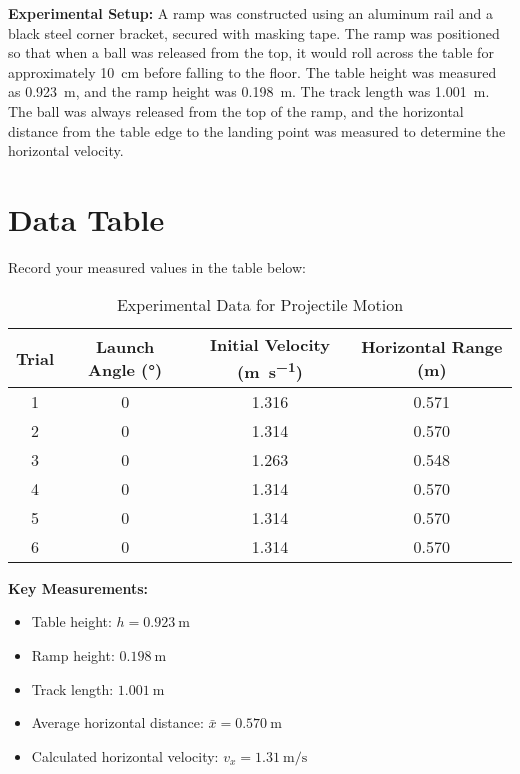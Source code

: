 \documentclass[12pt]{article}
\begin{document}
\textbf{Experimental Setup:}
A ramp was constructed using an aluminum rail and a black steel corner bracket, secured with masking tape. The ramp was positioned so that when a ball was released from the top, it would roll across the table for approximately \SI{10}{\centi\meter} before falling to the floor. The table height was measured as \SI{0.923}{\meter}, and the ramp height was \SI{0.198}{\meter}. The track length was \SI{1.001}{\meter}. The ball was always released from the top of the ramp, and the horizontal distance from the table edge to the landing point was measured to determine the horizontal velocity.

\section{Data Table}

Record your measured values in the table below:

\begin{table}[h]
\centering
\caption{Experimental Data for Projectile Motion}
\begin{tabular}{@{}cS[table-format=1.0]S[table-format=1.3]S[table-format=1.3]@{}}
\toprule
\textbf{Trial} & \textbf{Launch Angle (\si{\degree})} & \textbf{Initial Velocity (\si{\meter\per\second})} & \textbf{Horizontal Range (\si{\meter})} \\
 & 0 & 1.316 & 0.571 \\
2 & 0 & 1.314 & 0.570 \\
3 & 0 & 1.263 & 0.548 \\
4 & 0 & 1.314 & 0.570 \\
5 & 0 & 1.314 & 0.570 \\
6 & 0 & 1.314 & 0.570 \\
\bottomrule
\end{tabular}
\end{table}

\textbf{Key Measurements:}
\begin{itemize}
    \item Table height: $h = \SI{0.923}{\meter}$
    \item Ramp height: $\SI{0.198}{\meter}$
    \item Track length: $\SI{1.001}{\meter}$
    \item Average horizontal distance: $\bar{x} = \SI{0.570}{\meter}$
    \item Calculated horizontal velocity: $v_x = \SI{1.31}{\meter\per\second}$
\end{itemize}
\end{document}
